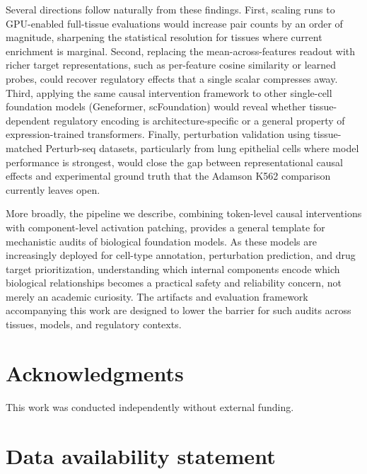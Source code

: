 \documentclass[10pt,letterpaper]{article}
\begin{document}
Several directions follow naturally from these findings. First, scaling runs
to GPU-enabled full-tissue evaluations would increase pair counts by an order
of magnitude, sharpening the statistical resolution for tissues where current
enrichment is marginal. Second, replacing the mean-across-features readout
with richer target representations, such as per-feature cosine similarity or
learned probes, could recover regulatory effects that a single scalar
compresses away. Third, applying the same causal intervention framework to
other single-cell foundation models (Geneformer, scFoundation) would reveal
whether tissue-dependent regulatory encoding is architecture-specific or a
general property of expression-trained transformers. Finally, perturbation
validation using tissue-matched Perturb-seq datasets, particularly from lung
epithelial cells where model performance is strongest, would close the gap
between representational causal effects and experimental ground truth that the
Adamson K562 comparison currently leaves open.

More broadly, the pipeline we describe, combining token-level causal
interventions with component-level activation patching, provides a general
template for mechanistic audits of biological foundation models. As these
models are increasingly deployed for cell-type annotation, perturbation
prediction, and drug target prioritization, understanding which internal
components encode which biological relationships becomes a practical safety
and reliability concern, not merely an academic curiosity. The artifacts and
evaluation framework accompanying this work are designed to lower the barrier
for such audits across tissues, models, and regulatory contexts.


\section*{Acknowledgments}

This work was conducted independently without external funding.


\section*{Data availability statement}
\end{document}
